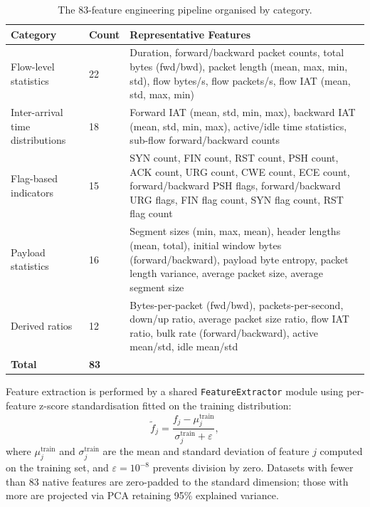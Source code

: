 \begin{table}[htbp]
\centering
\caption{The 83-feature engineering pipeline organised by category.}
\label{tab:features}
\small
\begin{tabular}{p{3.5cm} p{1.5cm} p{8.5cm}}
\toprule
\textbf{Category} & \textbf{Count} & \textbf{Representative Features} \\
\midrule
Flow-level statistics & 22 & Duration, forward/backward packet counts, total bytes (fwd/bwd), packet length (mean, max, min, std), flow bytes/s, flow packets/s, flow IAT (mean, std, max, min) \\
\addlinespace
Inter-arrival time distributions & 18 & Forward IAT (mean, std, min, max), backward IAT (mean, std, min, max), active/idle time statistics, sub-flow forward/backward counts \\
\addlinespace
Flag-based indicators & 15 & SYN count, FIN count, RST count, PSH count, ACK count, URG count, CWE count, ECE count, forward/backward PSH flags, forward/backward URG flags, FIN flag count, SYN flag count, RST flag count \\
\addlinespace
Payload statistics & 16 & Segment sizes (min, max, mean), header lengths (mean, total), initial window bytes (forward/backward), payload byte entropy, packet length variance, average packet size, average segment size \\
\addlinespace
Derived ratios & 12 & Bytes-per-packet (fwd/bwd), packets-per-second, down/up ratio, average packet size ratio, flow IAT ratio, bulk rate (forward/backward), active mean/std, idle mean/std \\
\midrule
\textbf{Total} & \textbf{83} & \\
\bottomrule
\end{tabular}
\end{table}

Feature extraction is performed by a shared \texttt{FeatureExtractor} module using per-feature z-score standardisation fitted on the training distribution:
\begin{equation}
\tilde{f}_j = \frac{f_j - \mu_j^{\mathrm{train}}}{\sigma_j^{\mathrm{train}} + \varepsilon},
\label{eq:zscore}
\end{equation}
where $\mu_j^{\mathrm{train}}$ and $\sigma_j^{\mathrm{train}}$ are the mean and standard deviation of feature $j$ computed on the training set, and $\varepsilon=10^{-8}$ prevents division by zero. Datasets with fewer than 83 native features are zero-padded to the standard dimension; those with more are projected via PCA retaining 95\% explained variance.



